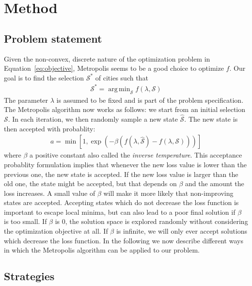\documentclass[conference,compsoc]{IEEEtran}
\newcommand{\selected}{\mathcal{S}}
\newcommand{\newselected}{\hat{\mathcal{S}}}
\DeclareMathOperator*{\argmin}{arg\,min}
\begin{document}
\section{Method}
\label{sec:method}

\subsection{Problem statement}
Given the non-convex, discrete nature of the optimization problem in
Equation~\ref{eq:objective}, Metropolis seems to be a good choice to optimize
$f$. Our goal is to find the selection $\selected^*$ of cities such that
\begin{align}
    \selected^* = \argmin_{\selected} f(\lambda, \selected)
\end{align}
The parameter $\lambda$ is assumed to be fixed and is part of the problem
specification. The Metropolis algorithm now works as follows: we start from an
initial selection $\selected$. In each iteration, we then randomly sample a new
state $\newselected$. The new state is then accepted with probablity:
\begin{align}
    a = \min \left[1, \exp(-\beta (f(\lambda, \newselected) - f(\lambda, \selected))) \right]
\end{align}
where $\beta$ a positive constant also called the \emph{inverse temperature}.
This acceptance probablity formulation implies that whenever the new loss value
is lower than the previous one, the new state is accepted. If the new loss value
is larger than the old one, the state might be accepted, but that depends on
$\beta$ and the amount the loss increases. A small value of $\beta$ will make it
more likely that non-improving states are accepted. Accepting states which do
not decrease the loss function is important to escape local minima, but can also
lead to a poor final solution if $\beta$ is too small. If $\beta$ is 0, the
solution space is explored randomly without considering the optimization
objective at all. If $\beta$ is infinite, we will only ever accept solutions
which decrease the loss function. In the following we now describe different
ways in which the Metropolis algorithm can be applied to our problem.

\subsection{Strategies}
\label{subsec: strategies}
\end{document}
